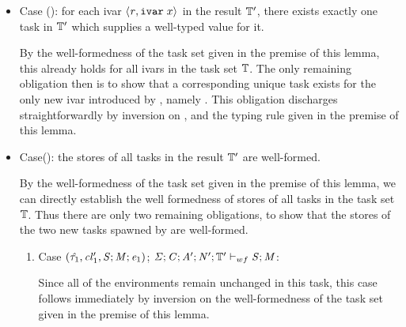 \begin{bproof}
\begin{bcase}[\dregparletexppar{}]
\begin{enumerate}
\begin{itemize}
\item Case ():
      for each ivar $\langle \mathit{r}, \texttt{ivar}\; x \rangle ^{}$ in the result $\mathbb{T}'$,
      there exists exactly one task in $\mathbb{T}'$ which supplies a well-typed value for it.

By the well-formedness of the task set given in the premise of this lemma,
this already holds for all ivars in the task set $\mathbb{T}$.
%
The only remaining obligation then is to show that a corresponding unique task exists
for the only new ivar introduced by \dregparletexppar{},
namely .
%
This obligation discharges straightforwardly by inversion on \dregparletexppar{},
and the typing rule given in the premise of this lemma.




\item Case():
      the stores of all tasks in the result $\mathbb{T}'$ are well-formed.

By the well-formedness of the task set given in the premise of this lemma,
we can directly establish the well formedness of stores of all tasks in the task set
$\mathbb{T}$.
%
Thus there are only two remaining obligations, to show that the stores of the two new tasks
spawned by \dregparletexppar{} are well-formed.
%
\begin{enumerate}

\item
Case $(\mathit{\hat{\tau}}_1, \mathit{cl}{}_1', \mathit{S};\mathit{M};\mathit{e}_1)$;
$\mathit{\Sigma};\mathit{C};\mathit{A}';\mathit{N}';\mathbb{T}' \vdash_{wf} \mathit{S};\mathit{M}$:

Since all of the environments remain unchanged in this task,
this case follows immediately by inversion on the well-formedness of the task set
given in the premise of this lemma.


\end{enumerate}
\end{itemize}
\end{enumerate}
\end{bcase}
\end{bproof}
